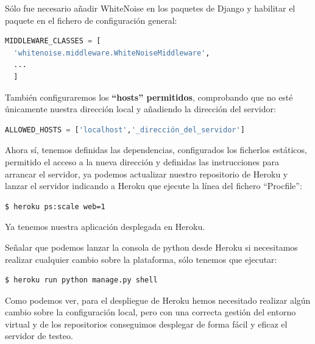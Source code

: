 \bigskip
Sólo fue necesario añadir WhiteNoise en los paquetes de Django y habilitar el paquete en el fichero de configuración general: 

\begin{lstlisting}[language=python]
  MIDDLEWARE_CLASSES = [
  'whitenoise.middleware.WhiteNoiseMiddleware',
  ...
  ]    
\end{lstlisting}


\bigskip 
También configuraremos los \textbf{``hosts'' permitidos}, comprobando que no esté únicamente nuestra dirección local y añadiendo la dirección del servidor:

\begin{lstlisting}[language=python]
  ALLOWED_HOSTS = ['localhost','_dirección_del_servidor']
\end{lstlisting}


\bigskip
Ahora sí, tenemos definidas las dependencias, configurados los ficherlos estáticos, permitido el acceso a la nueva dirección y definidas las instrucciones para arrancar el servidor, ya podemos actualizar nuestro repositorio de Heroku y lanzar el servidor indicando a Heroku que ejecute la línea del fichero ``Procfile'':

\begin{lstlisting}[language=bash]
  $ heroku ps:scale web=1
\end{lstlisting}


\bigskip
Ya tenemos nuestra aplicación desplegada en Heroku.

\bigskip
Señalar que podemos lanzar la consola de python desde Heroku si necesitamos realizar cualquier cambio sobre la plataforma, sólo tenemos que ejecutar:


\begin{lstlisting}[language=bash]
  $ heroku run python manage.py shell 
\end{lstlisting}



 \bigskip
 Como podemos ver, para el despliegue de Heroku hemos necesitado realizar algún cambio sobre la configuración local, pero con una correcta gestión del entorno virtual y de los repositorios conseguimos desplegar de forma fácil y eficaz el servidor de testeo.